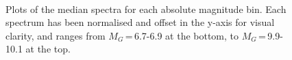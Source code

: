 \begin{figure}
    \\
    \caption{Plots of the median spectra for each absolute magnitude bin. Each spectrum has been normalised and offset in the y-axis for visual clarity, and ranges from $M_G$\,=\,6.7-6.9 at the bottom, to $M_G$\,=\,9.9-10.1 at the top.}
\end{figure}

